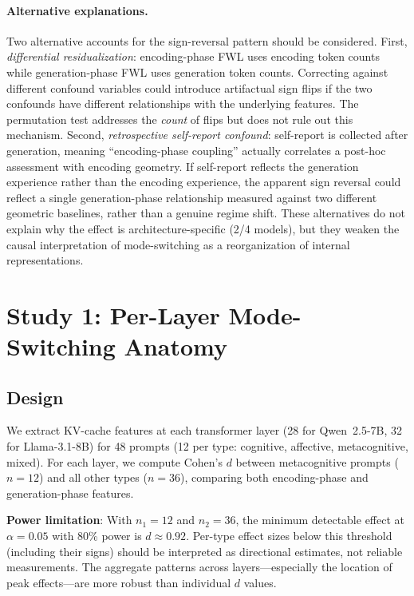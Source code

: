 \documentclass[11pt,a4paper]{article}
\begin{document}
\paragraph{Alternative explanations.} Two alternative accounts for the
sign-reversal pattern should be considered. First, \emph{differential
residualization}: encoding-phase FWL uses encoding token counts while
generation-phase FWL uses generation token counts. Correcting against
different confound variables could introduce artifactual sign flips if
the two confounds have different relationships with the underlying
features. The permutation test addresses the \emph{count} of flips but
does not rule out this mechanism. Second, \emph{retrospective self-report
confound}: self-report is collected after generation, meaning
``encoding-phase coupling'' actually correlates a post-hoc assessment
with encoding geometry. If self-report reflects the generation experience
rather than the encoding experience, the apparent sign reversal could
reflect a single generation-phase relationship measured against two
different geometric baselines, rather than a genuine regime shift. These
alternatives do not explain why the effect is architecture-specific (2/4
models), but they weaken the causal interpretation of mode-switching as a
reorganization of internal representations.

\section{Study 1: Per-Layer Mode-Switching Anatomy}

\subsection{Design}

We extract KV-cache features at each transformer layer (28 for
Qwen~2.5-7B, 32 for Llama-3.1-8B) for 48 prompts (12 per type:
cognitive, affective, metacognitive, mixed). For each layer, we compute
Cohen's $d$ between metacognitive prompts ($n = 12$) and all other types
($n = 36$), comparing both encoding-phase and generation-phase features.

\textbf{Power limitation}: With $n_1 = 12$ and $n_2 = 36$, the minimum
detectable effect at $\alpha = 0.05$ with 80\% power is $d \approx 0.92$.
Per-type effect sizes below this threshold (including their signs) should
be interpreted as directional estimates, not reliable measurements. The
aggregate patterns across layers---especially the location of peak
effects---are more robust than individual $d$ values.
\end{document}
